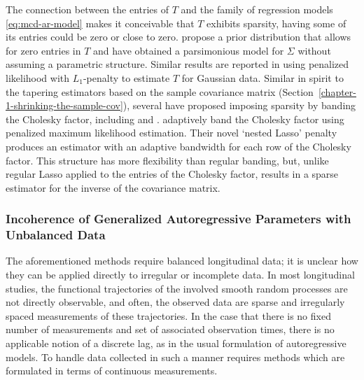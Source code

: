 The connection between the entries of $T$ and the family of regression models \eqref{eq:mcd-ar-model} makes it conceivable that $T$  exhibits sparsity, having some of its entries could be zero or close to zero. \cite{smith2002parsimonious} propose a prior distribution that allows for zero entries in $T$ and have obtained a parsimonious model for $\Sigma$ without assuming a parametric structure. Similar results are reported in \cite{huang2006covariance} using penalized likelihood with $L_1$-penalty to estimate $T$ for Gaussian data. Similar in spirit to the tapering estimators based on the sample covariance matrix (Section~\ref{chapter-1-shrinking-the-sample-cov}), several have proposed imposing sparsity by banding the Cholesky factor, including \cite{wu2003nonparametric} and \cite{huang2006covariance}. \cite{levina2008sparse} adaptively band the Cholesky factor using penalized maximum likelihood estimation. Their novel `nested Lasso' penalty produces an estimator with an adaptive bandwidth for each row of the Cholesky factor. This structure has more flexibility than regular banding, but, unlike regular Lasso applied to the entries of the Cholesky factor, results in a sparse estimator for the inverse of the covariance matrix.

\bigskip

\subsubsection{Incoherence of Generalized Autoregressive Parameters with Unbalanced Data}

The aforementioned methods require balanced longitudinal data; it is unclear how they can be applied directly to irregular or incomplete data. In most longitudinal studies, the functional trajectories of the involved smooth random processes are not directly observable, and often, the observed data are sparse and irregularly spaced measurements of these trajectories. In the case that there is no fixed number of measurements and set of associated observation times, there is no applicable notion of a discrete lag, as in the usual formulation of autoregressive models. To handle data collected in such a manner requires methods which are formulated in terms of continuous measurements.
 
 \bigskip 
 
